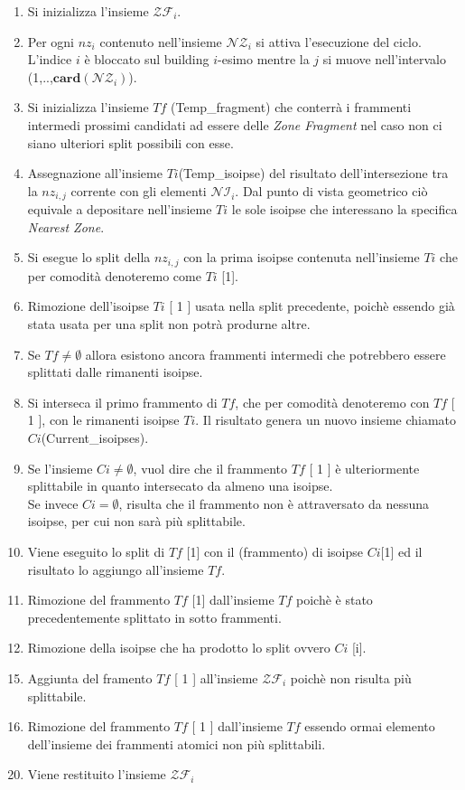 \begin{enumerate}
	\item Si inizializza l'insieme $\mathcal{ZF}_i$.
	\item Per ogni $nz_i$ contenuto nell'insieme $\mathcal{NZ}_i$ si attiva l'esecuzione del ciclo. L'indice $i$ è bloccato sul building $i$-esimo mentre la $j$ si muove nell'intervalo (1,..,$\mathbf{card}(\mathcal{NZ}_i)$).
	\item Si inizializza l'insieme $Tf$ (Temp\_fragment) che conterrà i frammenti intermedi prossimi candidati ad essere delle \textit{Zone Fragment} nel caso non ci siano ulteriori split possibili con esse.
	\item Assegnazione all'insieme $Ti$(Temp\_isoipse) del risultato dell'intersezione tra la $nz_{i,j}$ corrente con gli elementi $\mathcal{NI}_i$. Dal punto di vista geometrico ciò equivale a depositare nell'insieme $Ti$ le sole isoipse che interessano la specifica \textit{Nearest Zone}. 
	\item Si esegue lo split della $nz_{i,j}$ con la prima isoipse contenuta nell'insieme $Ti$ che per comodità denoteremo come $Ti$ [1].
	\item Rimozione dell'isoipse $Ti$ [ 1 ] usata nella split precedente, poichè essendo già stata usata per una split non potrà produrne altre.
	\item Se $Tf \not=\emptyset$ allora esistono ancora frammenti intermedi che potrebbero essere splittati dalle rimanenti isoipse.
	\item Si interseca il primo frammento di $Tf$, che per comodità denoteremo con $Tf$ [ 1 ], con le rimanenti isoipse $Ti$. Il risultato genera un nuovo insieme chiamato $Ci$(Current\_isoipses).
	\item Se l'insieme $Ci \not=\emptyset$, vuol dire che il frammento $Tf$ [ 1 ] è ulteriormente splittabile in quanto intersecato da almeno una isoipse.
	\\
	Se invece $Ci =\emptyset$, risulta che il frammento non è attraversato da nessuna isoipse, per cui non sarà più splittabile.
	\item Viene eseguito lo split di $Tf$ [1] con il (frammento) di isoipse $Ci$[1] ed il risultato lo aggiungo all'insieme $Tf$.
	\item Rimozione del frammento $Tf$ [1] dall'insieme $Tf$ poichè è stato precedentemente splittato in sotto frammenti.
	\item Rimozione della isoipse che ha prodotto lo split ovvero $Ci$ [i].
\end{enumerate}
\begin{enumerate}
	\setcounter{enumi}{14}
	\item Aggiunta del framento $Tf$ [ 1 ] all'insieme $\mathcal{ZF}_i$  poichè non risulta più splittabile.
	\item Rimozione del frammento $Tf$ [ 1 ] dall'insieme $Tf$ essendo ormai elemento dell'insieme dei frammenti atomici non più splittabili.
\end{enumerate}
\begin{enumerate}
		\setcounter{enumi}{19}
		\item Viene restituito l'insieme $\mathcal{ZF}_i$
\end{enumerate}
	

